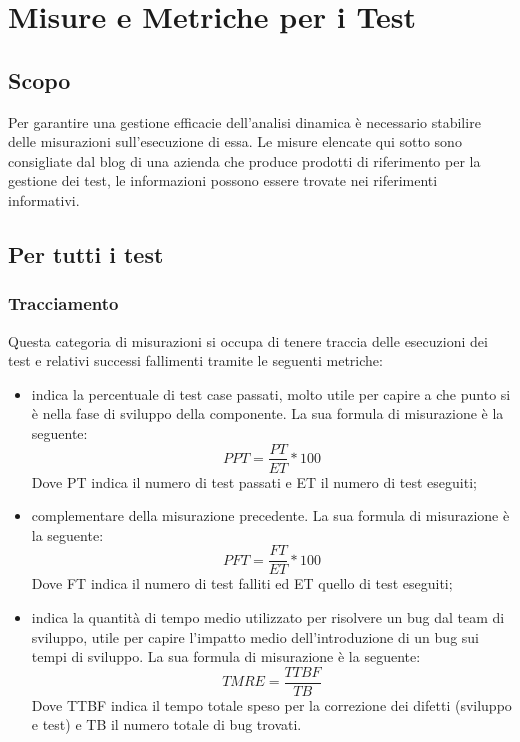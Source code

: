 \documentclass[PianoDiProgetto.tex]{subfiles}
\begin{document}
\chapter{Misure e Metriche per i Test}
\section{Scopo}
Per garantire una gestione efficacie dell'analisi dinamica è necessario stabilire delle misurazioni sull'esecuzione di essa.
Le misure elencate qui sotto sono consigliate dal blog di una azienda che produce prodotti di riferimento per la gestione dei test, le informazioni possono essere trovate nei riferimenti informativi.

\section{Per tutti i test}
\subsection{Tracciamento}
Questa categoria di misurazioni si occupa di tenere traccia delle esecuzioni dei test e relativi successi fallimenti tramite le seguenti metriche:
\begin{itemize}
	\item {} indica la percentuale di test case passati, molto utile per capire a che punto si è nella fase di sviluppo della componente. La sua formula di misurazione è la seguente:
	\[PPT=\dfrac{PT}{ET}*100\]
	Dove PT indica il numero di test passati e ET il numero di test eseguiti;
	\item {} complementare della misurazione precedente. La sua formula di misurazione è la seguente:
	\[PFT=\dfrac{FT}{ET}*100\]
	Dove FT indica il numero di test falliti ed ET quello di test eseguiti;
	\item {} indica la quantità di tempo medio utilizzato per risolvere un bug dal team di sviluppo, utile per capire l'impatto medio dell'introduzione di un bug sui tempi di sviluppo. La sua formula di misurazione è la seguente:
	\[TMRE=\dfrac{TTBF}{TB}\]
	Dove TTBF indica il tempo totale speso per la correzione dei difetti (sviluppo e test) e TB il numero totale di bug trovati.
\end{itemize}
\end{document}

